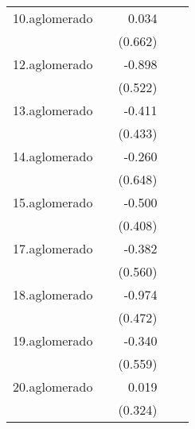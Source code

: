 {\begin{longtable}{l*{4}{D{.}{.}{-1}}}
\addlinespace
10.aglomerado&                     &       0.034         &                     &                     \\
            &                     &     (0.662)         &                     &                     \\
\addlinespace
12.aglomerado&                     &      -0.898         &                     &                     \\
            &                     &     (0.522)         &                     &                     \\
\addlinespace
13.aglomerado&                     &      -0.411         &                     &                     \\
            &                     &     (0.433)         &                     &                     \\
\addlinespace
14.aglomerado&                     &      -0.260         &                     &                     \\
            &                     &     (0.648)         &                     &                     \\
\addlinespace
15.aglomerado&                     &      -0.500         &                     &                     \\
            &                     &     (0.408)         &                     &                     \\
\addlinespace
17.aglomerado&                     &      -0.382         &                     &                     \\
            &                     &     (0.560)         &                     &                     \\
\addlinespace
18.aglomerado&                     &      -0.974\sym{*}  &                     &                     \\
            &                     &     (0.472)         &                     &                     \\
\addlinespace
19.aglomerado&                     &      -0.340         &                     &                     \\
            &                     &     (0.559)         &                     &                     \\
\addlinespace
20.aglomerado&                     &       0.019         &                     &                     \\
            &                     &     (0.324)         &                     &                     \\

\end{longtable}}
